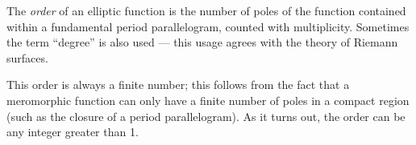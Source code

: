 \documentclass[12pt]{article}
\begin{document}
The \emph{order} of an elliptic function is the number of poles of the function contained within a fundamental period parallelogram, counted with multiplicity.
Sometimes the term ``degree'' is also used --- this usage agrees with the
theory of Riemann surfaces.

This order is always a finite number; this follows from the fact that a meromorphic function can only have a finite number of poles in a compact region (such as the closure of a period parallelogram).  As it turns out, the
order can be any integer greater than 1.
\end{document}
